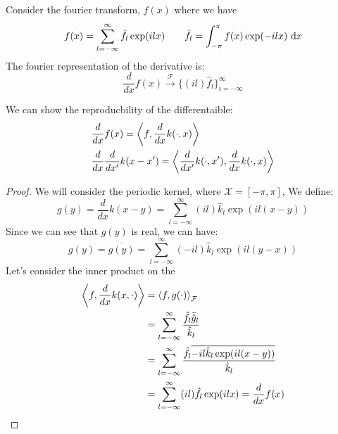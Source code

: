 \begin{remark}
    Consider the fourier transform, $f(x)$ where we have 
    \begin{equation*}
        f(x) = \sum^\infty_{l=-\infty}\hat{f}_l\exp(ilx) \qquad \hat{f}_l = \int^\pi_{-\pi} f(x)\exp(-ilx)\ \mathrm{d} x
    \end{equation*}
    The fourier representation of the derivative is:
    \begin{equation*}
        \frac{d}{dx}f(x) \xrightarrow{\mathcal{F}}\{ (il)\hat{f}_l \}^\infty_{i=-\infty}
    \end{equation*}
\end{remark}

\begin{proposition}
    We can show the reproducbility of the differentaible:
    \begin{equation*}
    \begin{aligned}
        &\frac{d}{dx} f(x) = \left\langle f, \frac{d}{dx}k(\cdot, x) \right\rangle \\
        &\frac{d}{dx}\frac{d}{dx'} k(x-x') = \left\langle \frac{d}{dx'}k(\cdot, x'), \frac{d}{dx}k(\cdot, x) \right\rangle \\
    \end{aligned}
    \end{equation*}
\end{proposition}
\begin{proof}
    We will consider the periodic kernel, where $\mathcal{X} = [-\pi,\pi]$, We define:
    \begin{equation*}
        g(y) = \frac{d}{dx}k(x-y) = \sum^\infty_{l=-\infty} (il)\hat{k}_l\exp(il(x-y))
    \end{equation*}
    Since we can see that $g(y)$ is real, we can have:
    \begin{equation*}
        g(y) = \overline{g(y)} = \sum^\infty_{l=-\infty} (-il)\hat{k}_l\exp(il(y-x)) 
    \end{equation*}
    Let's consider the inner product on the 
    \begin{equation*}
    \begin{aligned}
        \left\langle f, \frac{d}{dx}k(x,\cdot) \right\rangle &= \left\langle f, g(\cdot) \right\rangle_\mathcal{F} \\
        &=\sum^\infty_{l=-\infty} \frac{\hat{f}_l\bar{\hat{g}}_l }{\hat{k}_l}\\
        &= \sum^\infty_{l=-\infty} \frac{\hat{f}_l \overline{-il\hat{k}_l\exp(il(x-y))} }{\hat{k}_l} \\
        &= \sum^\infty_{l=-\infty}(il)\hat{f}_l\exp(ilx) = \frac{d}{dx}f(x)
    \end{aligned}
    \end{equation*}
\end{proof}

